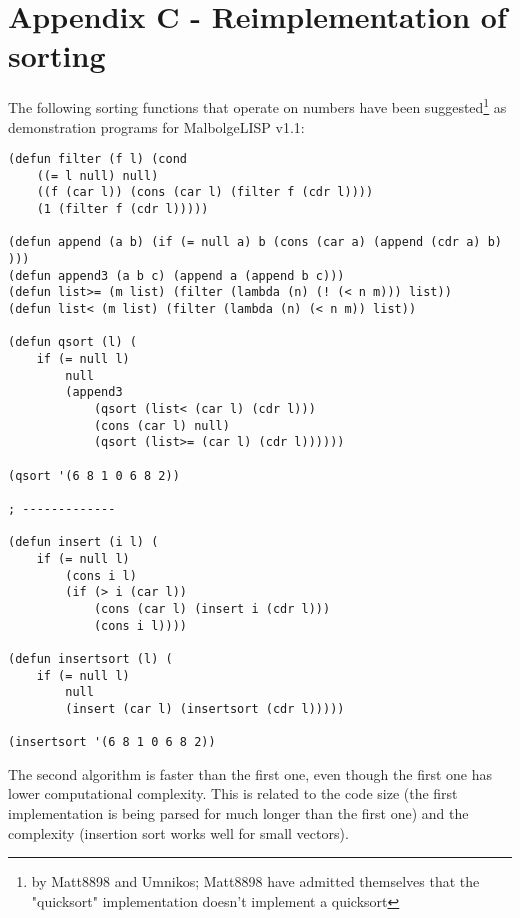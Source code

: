 
\chapter*{Appendix C - Reimplementation of sorting}

\par The following sorting functions that operate on numbers have been suggested\footnote{by Matt8898 and Umnikos; Matt8898 have admitted themselves that the "quicksort" implementation doesn't implement a quicksort} as demonstration programs for MalbolgeLISP v1.1:

\begin{verbatim}
(defun filter (f l) (cond
    ((= l null) null)
    ((f (car l)) (cons (car l) (filter f (cdr l))))
    (1 (filter f (cdr l)))))

(defun append (a b) (if (= null a) b (cons (car a) (append (cdr a) b) )))
(defun append3 (a b c) (append a (append b c)))
(defun list>= (m list) (filter (lambda (n) (! (< n m))) list))
(defun list< (m list) (filter (lambda (n) (< n m)) list))

(defun qsort (l) (
    if (= null l)
        null
        (append3
            (qsort (list< (car l) (cdr l)))
            (cons (car l) null)
            (qsort (list>= (car l) (cdr l))))))

(qsort '(6 8 1 0 6 8 2))

; -------------

(defun insert (i l) (
    if (= null l)
        (cons i l)
        (if (> i (car l))
            (cons (car l) (insert i (cdr l)))
            (cons i l))))

(defun insertsort (l) (
    if (= null l)
        null
        (insert (car l) (insertsort (cdr l)))))

(insertsort '(6 8 1 0 6 8 2))
\end{verbatim}

\par The second algorithm is faster than the first one, even though the first one has lower computational complexity. This is related to the code size (the first implementation is being parsed for much longer than the first one) and the complexity (insertion sort works well for small vectors).
